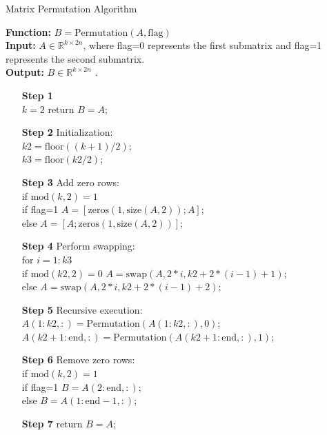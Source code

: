 \documentclass[12pt]{article}
\numberwithin{equation}{section} %
\begin{document}
\begin{algorithm}[H]
        \caption{Matrix Permutation Algorithm} \label{alg:Permutation}
        \textbf{Function:} $B=\text{Permutation}(A,\text{flag})$\\	
        \textbf{Input:}  $ A \in \mathbb{R}^{k \times 2n}$, where flag=0 represents the first submatrix and flag=1 represents the second submatrix.\\
        \textbf{Output:} $B \in \mathbb{R}^{k \times 2n}$ .
    \begin{itemize}
        \item[\textbf{Step 1}]\\
             $k=2$ \quad return $B=A$;
        \item[\textbf{Step 2}] Initialization:\\
            $k2 = \text{floor}((k+1)/2)$;\\
            $k3 = \text{floor}(k2/2)$;
        \item[\textbf{Step 3}] Add zero rows:\\
            if $\text{mod}(k, 2)=1$ \\
            if flag=1 \quad $A = [\text{zeros}(1, \text{size}(A, 2)); A]$;\\
            else  $A = [A; \text{zeros}(1, \text{size}(A, 2))]$;
        \item[\textbf{Step 4}] Perform swapping:\\
           for $i=1:k3$\\
           if $\text{mod}(k2, 2)=0$ \quad
            $A= \text{swap}(A,2*i,k2+2*(i-1)+1)$;\\
           else
            $A= \text{swap}(A,2*i,k2+2*(i-1)+2)$;
        \item[\textbf{Step 5}] Recursive execution:\\
           $A(1:k2, :) = \text{Permutation}(A(1:k2, :), 0)$;\\
           $A(k2+1:\text{end}, :) = \text{Permutation}(A(k2+1:\text{end}, :), 1)$;
        \item[\textbf{Step 6}] Remove zero rows: \\
           if $\text{mod}(k, 2)=1$ \\
           if flag=1 \quad $B = A(2:\text{end}, :)$;\\
           else $B = A(1:\text{end}-1, :)$;
        \item[\textbf{Step 7}] return $B=A$;
    \end{itemize}
\end{algorithm}
\end{document}

